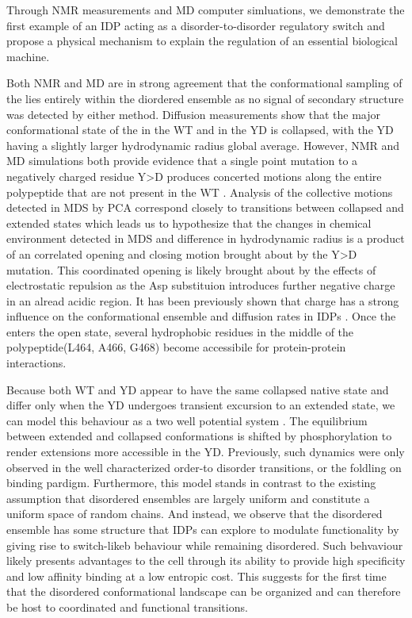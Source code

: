 Through NMR measurements and MD computer simluations, we demonstrate the first example of an IDP acting as a disorder-to-disorder regulatory switch and propose a physical mechanism to explain the regulation of an essential biological machine. 

Both NMR and MD are in strong agreement that the conformational sampling of the \gct{} lies entirely within the diordered ensemble as no signal of secondary structure was detected by either method. Diffusion measurements show that the major conformational state of the \gct{} in the WT and in the YD is collapsed, with the YD having a slightly larger hydrodynamic radius global average. However, NMR and MD simulations both provide evidence that a single point mutation to a negatively charged residue Y>D produces concerted motions along the entire polypeptide that are not present in the WT \gct{}. Analysis of the collective motions detected in MDS by PCA correspond closely to transitions between collapsed and extended states which leads us to hypothesize that the changes in chemical environment detected in MDS and difference in hydrodynamic radius is a product of an correlated opening and closing motion brought about by the Y>D mutation. This coordinated opening is likely brought about by the effects of electrostatic repulsion as the Asp substituion introduces further negative charge in an alread acidic region. It has been previously shown that charge has a strong influence on the conformational ensemble and diffusion rates in IDPs \cite{mao2010net}. Once the \gct{} enters the open state, several hydrophobic residues in the middle of the polypeptide(L464, A466, G468) become accessibile for protein-protein interactions.

 Because both WT and YD appear to have the same collapsed native state and differ only when the YD undergoes transient excursion to an extended state, we can model this behaviour as a two well potential system . The equilibrium between extended and collapsed conformations is shifted by phosphorylation to render extensions more accessible in the YD.  Previously, such dynamics were only observed in the well characterized order-to disorder transitions, or the foldling on binding pardigm. Furthermore, this model stands in contrast to the existing assumption that disordered ensembles are largely uniform  and constitute a uniform space of random chains. And instead, we observe that the disordered ensemble has some structure that IDPs can explore to modulate functionality by giving rise to switch-likeb behaviour while remaining disordered. Such behvaviour likely presents advantages to the cell through its ability to provide high specificity and low affinity binding at a low entropic cost. This suggests for the first time that the disordered conformational landscape can be organized and can therefore be host to coordinated and functional transitions.

